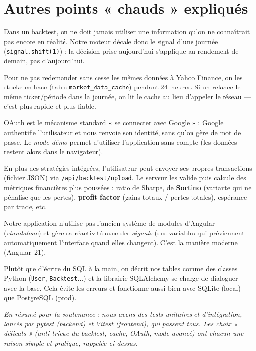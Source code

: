 \documentclass[11pt,a4paper]{article}
\newcommand{\code}[1]{\texttt{#1}}
\begin{document}
\section{Autres points « chauds » expliqués}
\begin{description}[leftmargin=1.2em,style=nextline]
  \item[Éviter de « tricher » (look-ahead).] Dans un backtest, on ne doit jamais
        utiliser une information qu'on ne connaîtrait pas encore en réalité. Notre
        moteur décale donc le signal d'une journée (\code{signal.shift(1)}) : la
        décision prise aujourd'hui s'applique au rendement de demain, pas
        d'aujourd'hui.
  \item[Le cache des cours (24\,h).] Pour ne pas redemander sans cesse les mêmes
        données à Yahoo Finance, on les stocke en base (table
        \code{market\_data\_cache}) pendant 24~heures. Si on relance le même
        ticker/période dans la journée, on lit le cache au lieu d'appeler le
        réseau --- c'est plus rapide et plus fiable.
  \item[Connexion Google (OAuth) et mode démo.] OAuth est le mécanisme standard
        « se connecter avec Google » : Google authentifie l'utilisateur et nous
        renvoie son identité, sans qu'on gère de mot de passe. Le \emph{mode démo}
        permet d'utiliser l'application sans compte (les données restent alors
        dans le navigateur).
  \item[Le mode avancé (import de trades).] En plus des stratégies intégrées,
        l'utilisateur peut envoyer ses propres transactions (fichier JSON) via
        \code{/api/backtest/upload}. Le serveur les valide puis calcule des
        métriques financières plus poussées : ratio de Sharpe, de \textbf{Sortino}
        (variante qui ne pénalise que les pertes), \textbf{profit factor} (gains
        totaux / pertes totales), espérance par trade, etc.
  \item[Angular « standalone » et « signals ».] Notre application n'utilise pas
        l'ancien système de modules d'Angular (\emph{standalone}) et gère sa
        réactivité avec des \emph{signals} (des variables qui préviennent
        automatiquement l'interface quand elles changent). C'est la manière
        moderne (Angular~21).
  \item[ORM SQLAlchemy.] Plutôt que d'écrire du SQL à la main, on décrit nos
        tables comme des classes Python (\code{User}, \code{Backtest}...) et la
        librairie SQLAlchemy se charge de dialoguer avec la base. Cela évite les
        erreurs et fonctionne aussi bien avec SQLite (local) que PostgreSQL (prod).
\end{description}

\bigskip
\noindent\textit{En résumé pour la soutenance : nous avons des tests unitaires et
d'intégration, lancés par pytest (backend) et Vitest (frontend), qui passent tous.
Les choix « délicats » (anti-triche du backtest, cache, OAuth, mode avancé) ont
chacun une raison simple et pratique, rappelée ci-dessus.}
\end{document}
